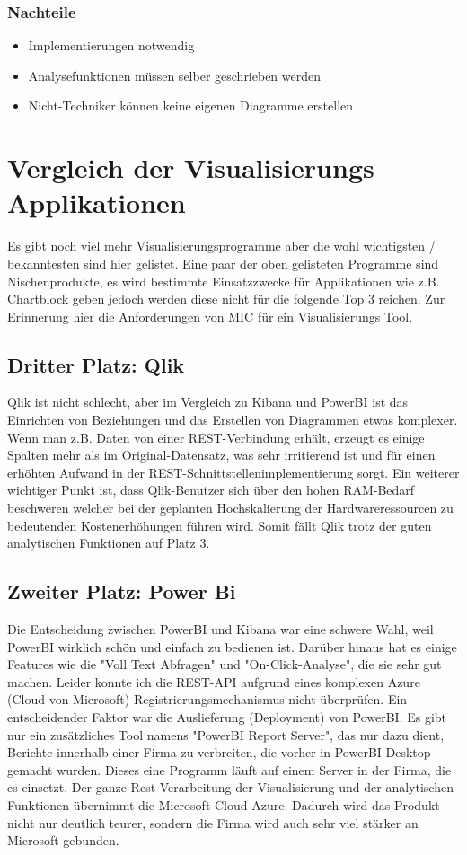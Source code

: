 \subsubsection{Nachteile}
\begin{itemize}
\item Implementierungen notwendig
\item Analysefunktionen müssen selber geschrieben werden
\item Nicht-Techniker können keine eigenen Diagramme erstellen
\end{itemize}
\section{Vergleich der Visualisierungs Applikationen}
Es gibt noch viel mehr Visualisierungsprogramme aber die wohl wichtigsten / bekanntesten sind hier gelistet. Eine paar der oben gelisteten Programme sind Nischenprodukte, es wird bestimmte Einsatzzwecke für Applikationen wie z.B. Chartblock geben jedoch werden diese nicht für die folgende Top 3 reichen. 
Zur Erinnerung hier die Anforderungen von MIC für ein Visualisierungs Tool.
\subsection{Dritter Platz: Qlik}
Qlik ist nicht schlecht, aber im Vergleich zu Kibana und PowerBI ist das Einrichten von Beziehungen und das Erstellen von Diagrammen etwas komplexer. Wenn man z.B. Daten von einer REST-Verbindung erhält, erzeugt es einige Spalten mehr als im Original-Datensatz, was sehr irritierend ist und für einen erhöhten Aufwand in der REST-Schnittstellenimplementierung sorgt. Ein weiterer wichtiger Punkt ist, dass Qlik-Benutzer sich über den hohen RAM-Bedarf beschweren welcher bei der geplanten Hochskalierung der Hardwareressourcen zu bedeutenden Kostenerhöhungen führen wird. Somit fällt Qlik trotz der guten analytischen Funktionen auf Platz 3.
\subsection{Zweiter Platz: Power Bi}
Die Entscheidung zwischen PowerBI und Kibana war eine schwere Wahl, weil PowerBI wirklich schön und einfach zu bedienen ist. Darüber hinaus hat es einige Features wie die "Voll Text Abfragen" und "On-Click-Analyse", die sie sehr gut machen. Leider konnte ich die REST-API aufgrund eines komplexen Azure (Cloud von Microsoft) Registrierungsmechanismus nicht überprüfen. Ein entscheidender Faktor war die Auslieferung (Deployment) von PowerBI. Es gibt nur ein zusätzliches Tool namens "PowerBI Report Server", das nur dazu dient, Berichte innerhalb einer Firma zu verbreiten, die vorher in PowerBI Desktop gemacht wurden. Dieses eine Programm läuft auf einem Server in der Firma, die es einsetzt. Der ganze Rest Verarbeitung der Visualisierung und der analytischen Funktionen übernimmt die Microsoft Cloud Azure. Dadurch wird das Produkt nicht nur deutlich teurer, sondern die Firma wird auch sehr viel stärker an Microsoft gebunden.
